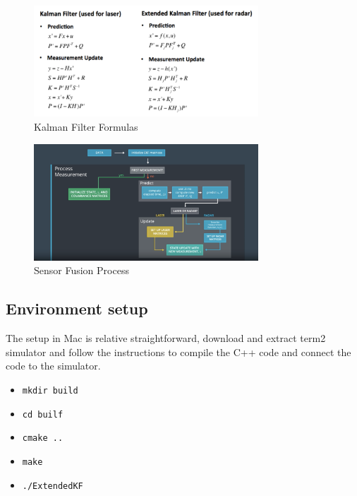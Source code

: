 \documentclass{article}
\begin{document}
\begin{figure}[h!t]
\begin{center}
\includegraphics[width=0.75\textwidth]{Formula.png}
\caption{Kalman Filter Formulas}
\label{fig1}
\end{center}
\end{figure}

\begin{figure}[h!t]
\begin{center}
\includegraphics[width=0.75\textwidth]{Flow.png}
\caption{Sensor Fusion Process}
\label{fig2}
\end{center}
\end{figure}

\subsection{Environment setup} 

The setup in Mac is relative straightforward, download and extract term2 simulator and follow the instructions to compile the C++ code and connect the code to the simulator. 
\begin{itemize}
  \item{\verb|mkdir build|}
  \item{\verb|cd builf|}
  \item{\verb|cmake ..|}
  \item{\verb|make|}
  \item{\verb|./ExtendedKF|}
\end{itemize}
\end{document}
